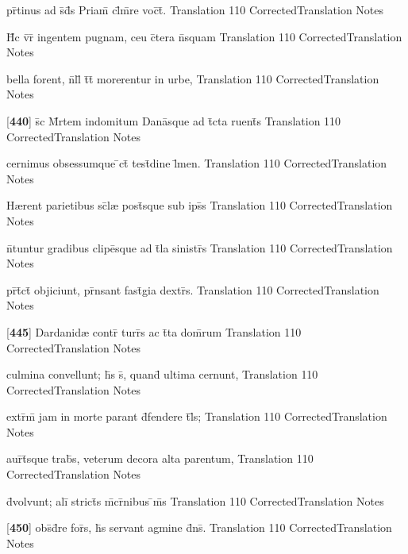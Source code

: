 \latline
  {pr\={}tinus ad s\={}d\={}s Priam\={\macron {\i}} cl\={}m\={}re voc\={}t\={\macron {\i}}.}
  { Translation }
  {110}
  { CorrectedTranslation }
  { Notes }


\latline
  {H\={\macron {\i}}c v\={}r\={} ingentem pugnam, ceu c\={}tera n\={}squam}
  { Translation }
  {110}
  { CorrectedTranslation }
  { Notes }


\latline
  {bella forent, n\={}ll\={\macron {\i}} t\={}t\={} morerentur in urbe,}
  { Translation }
  {110}
  { CorrectedTranslation }
  { Notes }


\latline
  {[\textbf{440}] s\={\macron {\i}}c M\={}rtem indomitum Dana\={}sque ad t\={}cta ruent\={\macron {\i}}s}
  { Translation }
  {110}
  { CorrectedTranslation }
  { Notes }


\latline
  {cernimus obsessumque \={}ct\={} test\={}dine l\={\macron {\i}}men.}
  { Translation }
  {110}
  { CorrectedTranslation }
  { Notes }


\latline
  {H{\ae}rent parietibus sc\={}l{\ae} post\={\macron {\i}}sque sub ips\={}s}
  { Translation }
  {110}
  { CorrectedTranslation }
  { Notes }


\latline
  {n\={\macron {\i}}tuntur gradibus clipe\={}sque ad t\={}la sinistr\={\macron {\i}}s}
  { Translation }
  {110}
  { CorrectedTranslation }
  { Notes }


\latline
  {pr\={}t\={}ct\={\macron {\i}} objiciunt, pr\={}nsant fast\={\macron {\i}}gia dextr\={\macron {\i}}s.}
  { Translation }
  {110}
  { CorrectedTranslation }
  { Notes }


\latline
  {[\textbf{445}] Dardanid{\ae} contr\={} turr\={\macron {\i}}s ac t\={}ta dom\={}rum}
  { Translation }
  {110}
  { CorrectedTranslation }
  { Notes }


\latline
  {culmina convellunt; h\={\macron {\i}}s s\={}, quand\={} ultima cernunt,}
  { Translation }
  {110}
  { CorrectedTranslation }
  { Notes }


\latline
  {extr\={}m\={} jam in morte parant d\={}fendere t\={}l\={\macron {\i}}s;}
  { Translation }
  {110}
  { CorrectedTranslation }
  { Notes }


\latline
  {aur\={}t\={}sque trab\={}s, veterum decora alta parentum,}
  { Translation }
  {110}
  { CorrectedTranslation }
  { Notes }


\latline
  {d\={}volvunt; ali\={\macron {\i}} strict\={\macron {\i}}s m\={}cr\={}nibus \={\macron {\i}}m\={}s}
  { Translation }
  {110}
  { CorrectedTranslation }
  { Notes }


\latline
  {[\textbf{450}] obs\={}d\={}re for\={}s, h\={}s servant agmine d\={}ns\={}.}
  { Translation }
  {110}
  { CorrectedTranslation }
  { Notes }


